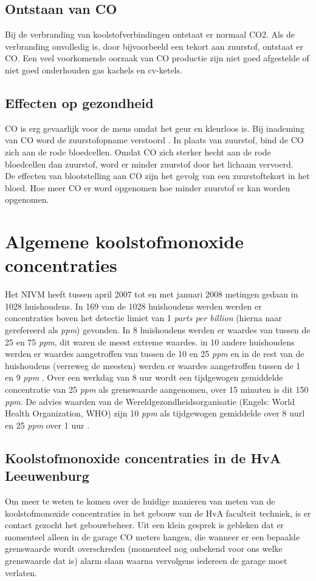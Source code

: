 \documentclass[a4paper, 11pt]{article} %
\begin{document}
\subsection{Ontstaan van CO}
Bij de verbranding van koolstofverbindingen ontstaat er normaal CO2. Als de verbranding onvolledig is, door bijvoorbeeld een tekort aan zuurstof, ontstaat er CO. Een veel voorkomende oorzaak van CO productie zijn niet goed afgestelde of niet goed onderhouden gas kachels en cv-ketels.

\subsection{Effecten op gezondheid}
CO is erg gevaarlijk voor de mens omdat het geur en kleurloos is. Bij inademing van CO word de zuurstofopname verstoord \cite{Effecten Koolmonoxide}. In plaats van zuurstof, bind de CO zich aan de rode bloedcellen. Omdat CO zich sterker hecht aan de rode bloedcellen dan zuurstof, word er minder zuurstof door het lichaam vervoerd. 
\\
De effecten van blootstelling aan CO zijn het gevolg van een zuurstoftekort in het bloed. Hoe meer CO er word opgenomen hoe minder zuurstof er kan worden opgenomen. 

\section{Algemene koolstofmonoxide concentraties}
Het NIVM heeft tussen april 2007 tot en met januari 2008 metingen gedaan in 1028 huishoudens. In 169 van de 1028 huishoudens werden werden er concentraties boven het detectie limiet van 1 \textit{parts per billion} (hierna naar gerefereerd als \textit{ppm}) gevonden. In 8 huishoudens werden er waardes van tussen de 25 en 75 \textit{ppm}, dit waren de meest extreme waardes. in 10 andere huishoudens werden er waardes aangetroffen van tussen de 10 en 25 \textit{ppm} en in de rest van de huishoudens (verreweg de meesten) werden er waardes aangetroffen tussen de 1 en 9 \textit{ppm} \cite{NIVM huurwoningen}. Over een werkdag van 8 uur wordt een tijdgewogen gemiddelde concentratie van 25 \textit{ppm} als grenswaarde aangenomen, over 15 minuten is dit 150 \textit{ppm}. De advies waarden van de Wereldgezondheidsorganisatie (Engels: World Health Organization, WHO) zijn 10 \textit{ppm} als tijdgewogen gemiddelde over 8 uurl en 25 \textit{ppm} over 1 uur \cite{Blootstelling aan CO}.
\subsection{Koolstofmonoxide concentraties in de HvA Leeuwenburg}
Om meer te weten te komen over de huidige manieren van meten van de koolstofmonoxide concentraties in het gebouw van de HvA faculteit techniek, is er contact gezocht het gebouwbeheer. Uit een klein gesprek is gebleken dat er momenteel alleen in de garage CO meters hangen, die wanneer er een bepaalde grenswaarde wordt overschreden (momenteel nog onbekend voor ons welke grenswaarde dat is) alarm slaan waarna vervolgens iedereen de garage moet verlaten.
\end{document}
